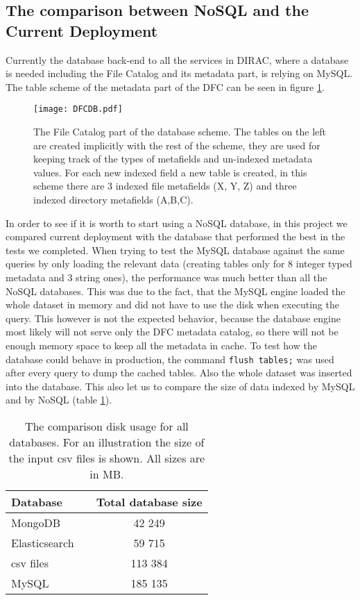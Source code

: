\subsection{The comparison between NoSQL and the Current Deployment}

Currently the database back-end to all the services in DIRAC, where a database is needed including the File 
Catalog and its metadata part, is relying on MySQL. The table scheme of the metadata part of the DFC can be seen 
in figure \ref{fig:DFCUML}.

\begin{figure}[h]
	\centering
	\texttt{[image: DFCDB.pdf]}
	\caption{The File Catalog part of the database scheme. The tables on the left are created implicitly with the
	rest of the scheme, they are used  for keeping track of the types of metafields and un-indexed  metadata 
	values. For each new indexed field a new table is created, in this scheme there are 3 indexed file metafields
	(X, Y, Z) and three indexed directory metafields (A,B,C).}
	\label{fig:DFCUML}
\end{figure}

In order to see if it is worth to start using a NoSQL database, in this project we compared current deployment  
with the database that performed the
best in the tests we completed. When trying to test the MySQL database against the same queries 
by only loading the relevant data (creating tables only for 8 integer typed metadata and 3 string ones), the 
performance was much better than all the NoSQL databases. This was due to the fact, that the MySQL engine loaded
the whole dataset in memory and did not have to use the disk when executing the query. This however is not the expected 
behavior, because the database engine most likely will not serve only the DFC metadata catalog, so there will not
be enough memory space to keep all the metadata in cache. To test how the database could behave in production, the 
command \texttt{flush tables;} was used after every query to dump the cached tables. Also the whole dataset
was inserted into the database. This also let us to compare the size of data indexed by MySQL and by NoSQL (table 
\ref{tab:allDbSizes}). 

\begin{table}[h]
\centering
\begin{tabular}{lcc}
\toprule
\textbf{Database}      & & \textbf{Total database size}  \\ 
\midrule
MongoDB                & & 42 249                        \\ 
Elasticsearch          & & 59 715                        \\ 
csv files              & & 113 384                       \\ 
MySQL                  & & 185 135                       \\ 
\toprule
\end{tabular}
\caption{The comparison disk usage for all databases. For an illustration the size of the input csv files is
shown. All sizes are in MB.}
\label{tab:allDbSizes}
\end{table}

